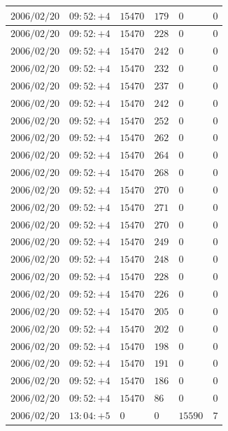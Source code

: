 \documentclass[a4j,papersize,disablejfam,slide,14pt]{jsarticle}
\begin{document}
\begin{description}
\begin{center}
\begin{longtable}{|l|l|l|l|l|l|}
					$2006/02/20$ & $09:52:+4$  & $15470$ & $179$ & $0$ & $0$ \\ \hline
					$2006/02/20$ & $09:52:+4$  & $15470$ & $228$ & $0$ & $0$ \\ \hline
					$2006/02/20$ & $09:52:+4$  & $15470$ & $242$ & $0$ & $0$ \\ \hline
					$2006/02/20$ & $09:52:+4$  & $15470$ & $232$ & $0$ & $0$ \\ \hline
					$2006/02/20$ & $09:52:+4$  & $15470$ & $237$ & $0$ & $0$ \\ \hline
					$2006/02/20$ & $09:52:+4$  & $15470$ & $242$ & $0$ & $0$ \\ \hline
					$2006/02/20$ & $09:52:+4$  & $15470$ & $252$ & $0$ & $0$ \\ \hline
					$2006/02/20$ & $09:52:+4$  & $15470$ & $262$ & $0$ & $0$ \\ \hline
					$2006/02/20$ & $09:52:+4$  & $15470$ & $264$ & $0$ & $0$ \\ \hline
					$2006/02/20$ & $09:52:+4$  & $15470$ & $268$ & $0$ & $0$ \\ \hline
					$2006/02/20$ & $09:52:+4$  & $15470$ & $270$ & $0$ & $0$ \\ \hline
					$2006/02/20$ & $09:52:+4$  & $15470$ & $271$ & $0$ & $0$ \\ \hline
					$2006/02/20$ & $09:52:+4$  & $15470$ & $270$ & $0$ & $0$ \\ \hline
					$2006/02/20$ & $09:52:+4$  & $15470$ & $249$ & $0$ & $0$ \\ \hline
					$2006/02/20$ & $09:52:+4$  & $15470$ & $248$ & $0$ & $0$ \\ \hline
					$2006/02/20$ & $09:52:+4$  & $15470$ & $228$ & $0$ & $0$ \\ \hline
					$2006/02/20$ & $09:52:+4$  & $15470$ & $226$ & $0$ & $0$ \\ \hline
					$2006/02/20$ & $09:52:+4$  & $15470$ & $205$ & $0$ & $0$ \\ \hline
					$2006/02/20$ & $09:52:+4$  & $15470$ & $202$ & $0$ & $0$ \\ \hline
					$2006/02/20$ & $09:52:+4$  & $15470$ & $198$ & $0$ & $0$ \\ \hline
					$2006/02/20$ & $09:52:+4$  & $15470$ & $191$ & $0$ & $0$ \\ \hline
					$2006/02/20$ & $09:52:+4$  & $15470$ & $186$ & $0$ & $0$ \\ \hline
					$2006/02/20$ & $09:52:+4$  & $15470$ & $86$ & $0$ & $0$ \\ \hline
					$2006/02/20$ & $13:04:+5$  & $0$ & $0$ & $15590$ & $7$ \\ \hline

\end{longtable}
\end{center}
\end{description}
\end{document}

